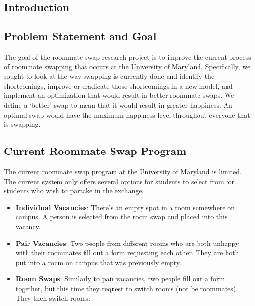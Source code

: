 \documentclass[12pt]{article}
\begin{document}
\begin{multicols}{2}

\section{Introduction}
\subsection{Problem Statement and Goal}
The goal of the roommate swap research project is to improve the current process of roommate swapping that occurs at the University of Maryland. Specifically, we sought to look at the way swapping is currently done and identify the shortcomings, improve or eradicate those shortcomings in a new model, and implement an optimization that would result in better roommate swaps. We define a ‘better’ swap to mean that it would result in greater happiness. An optimal swap would have the maximum happiness level throughout everyone that is swapping.

\subsection{Current Roommate Swap Program}
The current roommate swap program at the University of Maryland is limited. The current system only offers several options for students to select from for students who wish to partake in the exchange. 


\begin{itemize}[noitemsep]
\item \textbf{Individual Vacancies}: There's an empty spot in a room somewhere on campus. A person is selected from the room swap and placed into this vacancy.\\
\item \textbf{Pair Vacancies}: Two people from different rooms who are both unhappy with their roommates fill out a form requesting each other. They are both put into a room on campus that was previously empty.\\
\item \textbf{Room Swaps}: Similarly to pair vacancies, two people fill out a form together, but this time they request to switch rooms (not be roommates). They then switch rooms.
\end{itemize}


\end{multicols}
\end{document}
